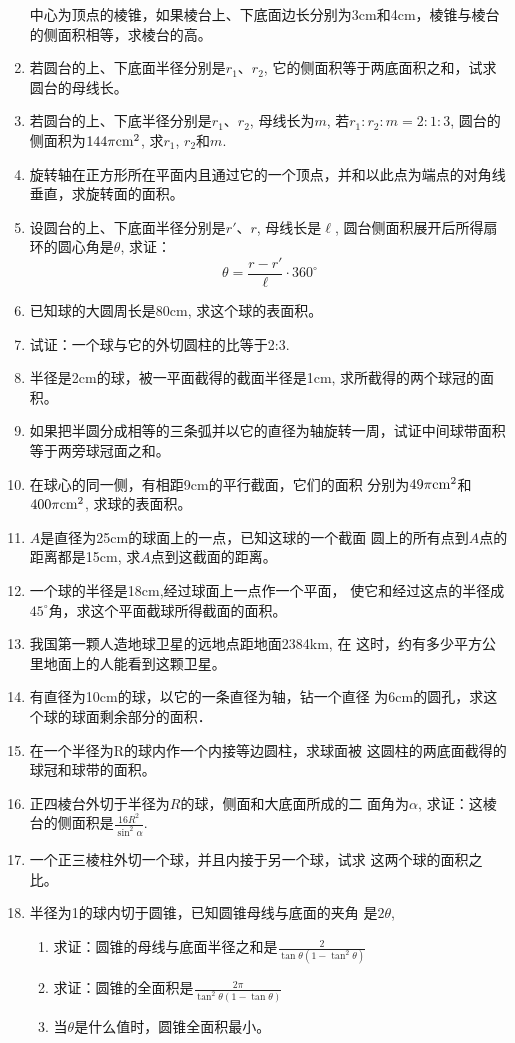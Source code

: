\begin{enumerate}
中心为顶点的棱锥，如果棱台上、下底面边长分别为3cm和4cm，棱锥与棱台的侧面积相等，求棱台的高。
\item 若圆台的上、下底面半径分别是$r_1$、$r_2$, 它的侧面积等于两底面积之和，试求圆台的母线长。
\item 若圆台的上、下底半径分别是$r_1$、$r_2$, 母线长为$m$, 若$r_1:r_2:m=2:1:3$, 圆台的侧面积为$144\pi{\rm cm^2}$, 求$r_1$, $r_2$和$m$.
\item 旋转轴在正方形所在平面内且通过它的一个顶点，并和以此点为端点的对角线垂直，求旋转面的面积。
\item 设圆台的上、下底面半径分别是$r'$、$r$, 母线长是$\ell$, 圆台侧面积展开后所得扇环的圆心角是$\theta$, 求证：
\[\theta=\frac{r-r'}{\ell}\cdot 360^{\circ}\]
\item 已知球的大圆周长是80cm, 求这个球的表面积。
\item 试证：一个球与它的外切圆柱的比等于2:3. 
\item 半径是2cm的球，被一平面截得的截面半径是1cm, 求所截得的两个球冠的面积。
\item 如果把半圆分成相等的三条弧并以它的直径为轴旋转一周，试证中间球带面积等于两旁球冠面之和。
\item 在球心的同一侧，有相距9cm的平行截面，它们的面积
分别为$49\pi {\rm cm^2}$和$400\pi {\rm cm^2}$, 求球的表面积。
\item $A$是直径为25cm的球面上的一点，已知这球的一个截面
圆上的所有点到$A$点的距离都是15cm, 求$A$点到这截面的距离。
\item 一个球的半径是18cm,经过球面上一点作一个平面，
使它和经过这点的半径成$45^{\circ}$角，求这个平面截球所得截面的面积。
\item 我国第一颗人造地球卫星的远地点距地面2384km, 在
这时，约有多少平方公里地面上的人能看到这颗卫星。
\item 有直径为10cm的球，以它的一条直径为轴，钻一个直径
为6cm的圆孔，求这个球的球面剩余部分的面积．
\item 在一个半径为R的球内作一个内接等边圆柱，求球面被
这圆柱的两底面截得的球冠和球带的面积。
\item 正四棱台外切于半径为$R$的球，侧面和大底面所成的二
面角为$\alpha$, 求证：这棱台的侧面积是$\frac{16R^2}{\sin^2\alpha}$.
\item 一个正三棱柱外切一个球，并且内接于另一个球，试求
这两个球的面积之比。
\item 半径为1的球内切于圆锥，已知圆锥母线与底面的夹角
是$2\theta$,
\begin{enumerate}
\item 求证：圆锥的母线与底面半径之和是$\frac{2}{\tan\theta(1-\tan^2\theta)}$
\item 求证：圆锥的全面积是$\frac{2\pi}{\tan^2\theta(1-\tan\theta)}$
\item 当$\theta$是什么值时，圆锥全面积最小。
\end{enumerate}
\end{enumerate}

